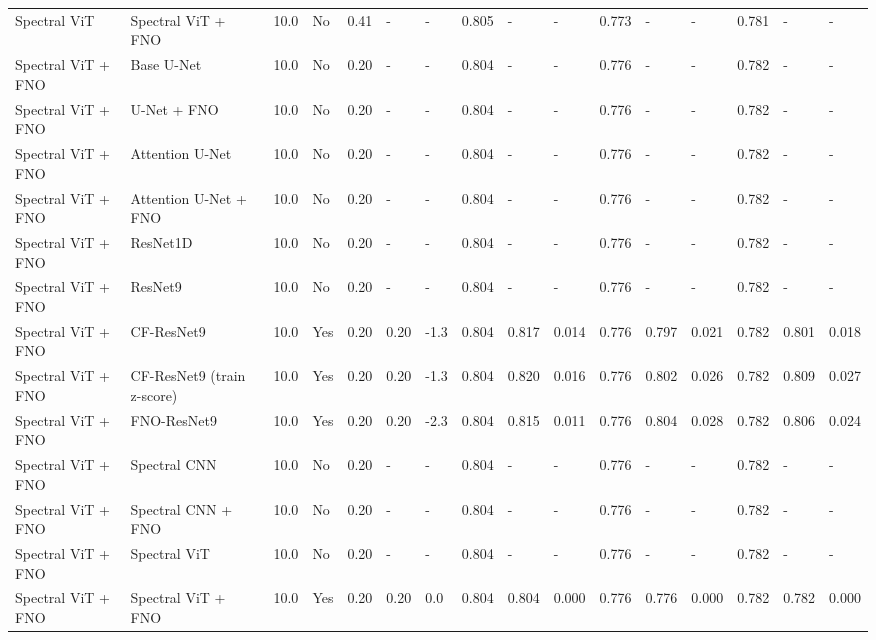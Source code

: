 \begin{longtable}{llllllllllllllll}
Spectral ViT & Spectral ViT + FNO & 10.0 & No & 0.41 & - & - & 0.805 & - & - & 0.773 & - & - & 0.781 & - & - \\
Spectral ViT + FNO & Base U-Net & 10.0 & No & 0.20 & - & - & 0.804 & - & - & 0.776 & - & - & 0.782 & - & - \\
Spectral ViT + FNO & U-Net + FNO & 10.0 & No & 0.20 & - & - & 0.804 & - & - & 0.776 & - & - & 0.782 & - & - \\
Spectral ViT + FNO & Attention U-Net & 10.0 & No & 0.20 & - & - & 0.804 & - & - & 0.776 & - & - & 0.782 & - & - \\
Spectral ViT + FNO & Attention U-Net + FNO & 10.0 & No & 0.20 & - & - & 0.804 & - & - & 0.776 & - & - & 0.782 & - & - \\
Spectral ViT + FNO & ResNet1D & 10.0 & No & 0.20 & - & - & 0.804 & - & - & 0.776 & - & - & 0.782 & - & - \\
Spectral ViT + FNO & ResNet9 & 10.0 & No & 0.20 & - & - & 0.804 & - & - & 0.776 & - & - & 0.782 & - & - \\
Spectral ViT + FNO & CF-ResNet9 & 10.0 & Yes & 0.20 & 0.20 & -1.3 & 0.804 & 0.817 & 0.014 & 0.776 & 0.797 & 0.021 & 0.782 & 0.801 & 0.018 \\
Spectral ViT + FNO & CF-ResNet9 (train z-score) & 10.0 & Yes & 0.20 & 0.20 & -1.3 & 0.804 & 0.820 & 0.016 & 0.776 & 0.802 & 0.026 & 0.782 & 0.809 & 0.027 \\
Spectral ViT + FNO & FNO-ResNet9 & 10.0 & Yes & 0.20 & 0.20 & -2.3 & 0.804 & 0.815 & 0.011 & 0.776 & 0.804 & 0.028 & 0.782 & 0.806 & 0.024 \\
Spectral ViT + FNO & Spectral CNN & 10.0 & No & 0.20 & - & - & 0.804 & - & - & 0.776 & - & - & 0.782 & - & - \\
Spectral ViT + FNO & Spectral CNN + FNO & 10.0 & No & 0.20 & - & - & 0.804 & - & - & 0.776 & - & - & 0.782 & - & - \\
Spectral ViT + FNO & Spectral ViT & 10.0 & No & 0.20 & - & - & 0.804 & - & - & 0.776 & - & - & 0.782 & - & - \\
Spectral ViT + FNO & Spectral ViT + FNO & 10.0 & Yes & 0.20 & 0.20 & 0.0 & 0.804 & 0.804 & 0.000 & 0.776 & 0.776 & 0.000 & 0.782 & 0.782 & 0.000 \\
\end{longtable}
